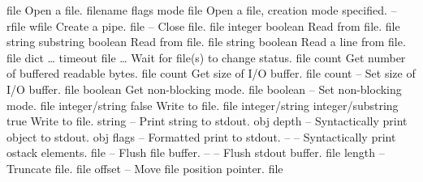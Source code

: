 \begin{longtable}{}
	{file}
	{Open a file.}
\optableent
	{filename flags mode}
	{{\bf {}}}
	{file}
	{Open a file, creation mode specified.}
\hline
\optableent
	{--}
	{{\bf {}}}
	{rfile wfile}
	{Create a pipe.}
\hline
\optableent
	{file}
	{{\bf {}}}
	{--}
	{Close file.}
\hline
\optableent
	{file}
	{{\bf {}}}
	{integer boolean}
	{Read from file.}
\optableent
	{file string}
	{{\bf {}}}
	{substring boolean}
	{Read from file.}
\optableent
	{file}
	{{\bf {}}}
	{string boolean}
	{Read a line from file.}
\hline
\optableent
	{{\lt}file dict \dots{\gt} timeout}
	{{\bf {}}}
	{{\lb}file \dots{\rb}}
	{Wait for file(s) to change status.}
\hline
\optableent
	{file}
	{{\bf {}}}
	{count}
	{Get number of buffered readable bytes.}
\hline
\optableent
	{file}
	{{\bf {}}}
	{count}
	{Get size of I/O buffer.}
\hline
\optableent
	{file count}
	{{\bf {}}}
	{--}
	{Set size of I/O buffer.}
\hline
\optableent
	{file}
	{{\bf {}}}
	{boolean}
	{Get non-blocking mode.}
\hline
\optableent
	{file boolean}
	{{\bf {}}}
	{--}
	{Set non-blocking mode.}
\hline
\optableent
	{file integer/string}
	{{\bf {}}}
	{false}
	{Write to file.}
\optableent
	{file integer/string}
	{{\bf {}}}
	{integer/substring true}
	{Write to file.}
\hline
\optableent
	{string}
	{{\bf {}}}
	{--}
	{Print string to stdout.}
\hline
\optableent
	{obj depth}
	{{\bf {}}}
	{--}
	{Syntactically print object to stdout.}
\hline
\optableent
	{obj flags}
	{{\bf {}}}
	{--}
	{Formatted print to stdout.}
\hline
\optableent
	{--}
	{{\bf {}}}
	{--}
	{Syntactically print ostack elements.}
\hline
\optableent
	{file}
	{{\bf {}}}
	{--}
	{Flush file buffer.}
\hline
\optableent
	{--}
	{{\bf {}}}
	{--}
	{Flush stdout buffer.}
\hline
\optableent
	{file length}
	{{\bf {}}}
	{--}
	{Truncate file.}
\hline
\optableent
	{file offset}
	{{\bf {}}}
	{--}
	{Move file position pointer.}
\hline
\optableent
	{file}
	{{\bf {}}}

\end{longtable}
